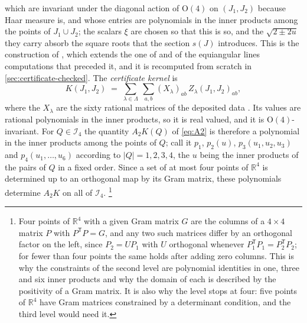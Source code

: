 \documentclass[11pt,reqno]{amsart}
\renewcommand{\_}{\origunderscore\allowbreak}
\numberwithin{equation}{section}
\theoremstyle{plain}
\theoremstyle{definition}
\theoremstyle{remark}
\begin{document}
which are invariant under the diagonal action of $\mathrm O(4)$ on
$(J_1,J_2)$ because Haar measure is, and whose entries are polynomials in
the inner products among the points of $J_1\cup J_2$; the scalars
$\xi$ are chosen so that this is so, and the $\sqrt{2\pm2u}$ they carry
absorb the square roots that the section $s(J)$ introduces. This
is the construction of \cite{LLM24}, which extends the one of
\cite{dLV15} and of the equiangular lines computations that preceded it,
and it is recomputed from scratch in \cref{sec:certificate-checked}. The
\emph{certificate kernel} is
\begin{equation}\label{eq:Kcert}
  K(J_1,J_2)\;=\;\sum_{\lambda\in\Lambda}\ \sum_{a,b}(X_\lambda)_{ab}\,Z_\lambda(J_1,J_2)_{ab},
\end{equation}
where the $X_\lambda$ are the sixty rational matrices of the deposited
data \cite{LLM24data}. Its values are rational polynomials in the inner
products, so it is real valued, and it is $\mathrm O(4)$-invariant. For
$Q\in\mathcal I_4$ the quantity $A_2K(Q)$ of \eqref{eq:A2} is therefore a
polynomial in the inner products among the points of $Q$; call it
$p_1$, $p_2(u)$, $p_3(u_1,u_2,u_3)$ and $p_4(u_1,\dots,u_6)$ according
to $|Q|=1,2,3,4$, the $u$ being the inner products of the pairs of $Q$ in a
fixed order. Since a set of at most four points of $\mathbb R^4$ is
determined up to an orthogonal map by its Gram matrix, these polynomials
determine $A_2K$ on all of $\mathcal I_4$.%
\footnote{Four points of $\mathbb R^4$ with a given Gram matrix $G$ are
  the columns of a $4\times4$ matrix $P$ with $P^{\mathsf T}P=G$, and any
  two such matrices differ by an orthogonal factor on the left, since
  $P_2=UP_1$ with $U$ orthogonal whenever $P_1^{\mathsf T}P_1=P_2^{\mathsf
  T}P_2$; for fewer than four points the same holds after adding zero
  columns. This is why the constraints of the second level are
  polynomial identities in one, three and six inner products and why
  the domain of each is described by the positivity of a Gram matrix.
  It is also why the level stops at four: five points of $\mathbb R^4$
  have Gram matrices constrained by a determinant condition, and the
  third level would need it.}
\end{document}
